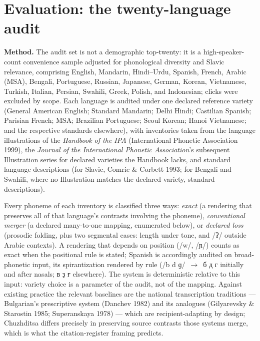\documentclass[12pt]{article}
\newcommand{\cz}[1]{{\chu #1}}
\newcommand{\ph}[1]{{\ipafont/#1/}}
\begin{document}
\section{Evaluation: the twenty-language audit}\label{sec:audit}

\textbf{Method.} The audit set is not a demographic top-twenty: it is a high-speaker-count convenience sample adjusted for phonological diversity and Slavic relevance, comprising English, Mandarin, Hindi--Urdu, Spanish, French, Arabic (MSA), Bengali, Portuguese, Russian, Japanese, German, Korean, Vietnamese, Turkish, Italian, Persian, Swahili, Greek, Polish, and Indonesian; clicks were excluded by scope. Each language is audited under one declared reference variety (General American English; Standard Mandarin; Delhi Hindi; Castilian Spanish; Parisian French; MSA; Brazilian Portuguese; Seoul Korean; Hanoi Vietnamese; and the respective standards elsewhere), with inventories taken from the language illustrations of the \emph{Handbook of the IPA} (International Phonetic Association 1999), the \emph{Journal of the International Phonetic Association}'s subsequent Illustration series for declared varieties the Handbook lacks, and standard language descriptions (for Slavic, Comrie \& Corbett 1993; for Bengali and Swahili, where no Illustration matches the declared variety, standard descriptions).

Every phoneme of each inventory is classified three ways: \emph{exact} (a rendering that preserves all of that language's contrasts involving the phoneme), \emph{conventional merger} (a declared many-to-one mapping, enumerated below), or \emph{declared loss} (prosodic folding, plus two segmental cases: length under tone, and \ph{ʔ} outside Arabic contexts). A rendering that depends on position (\ph{w}, \ph{ɲ}) counts as exact when the positional rule is stated; Spanish is accordingly audited on broad-phonetic input, its spirantization rendered by rule (\ph{b d ɡ}~$\rightarrow$~\cz{б д г} initially and after nasals; \cz{в ҙ ғ} elsewhere). The system is deterministic relative to this input: variety choice is a parameter of the audit, not of the mapping. Against existing practice the relevant baselines are the national transcription traditions — Bulgarian's prescriptive system (Danchev 1982) and its analogues (Gilyarevsky \& Starostin 1985; Superanskaya 1978) — which are recipient-adapting by design; Chuzhditsa differs precisely in preserving source contrasts those systems merge, which is what the citation-register framing predicts.
\end{document}
